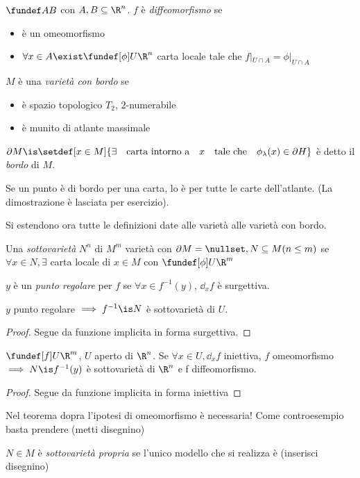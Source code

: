 \begin{defn}
$\fundef AB$ con $A,B\subseteq \R^n$. $f$ è \emph{diffeomorfismo} se
\begin{itemize}
 \item è un omeomorfismo
 \item $\forall x\in A \exist \fundef[\phi] U\R^n$ carta locale tale che $f|_{U\cap A}=\phi|_{U\cap A}$
\end{itemize}
\end{defn}
\begin{defn}
 $M$ è una \emph{varietà con bordo} se 
 \begin{itemize}
  \item è spazio topologico $T_2$, $2$-numerabile
  \item è munito di atlante massimale 
 \end{itemize}
\end{defn}
\begin{defn}[Bordo]
$\partial M\is \setdef[x\in M]{\exists\quad \text{carta intorno a}\quad x \quad\text{tale che}\quad \phi_{\lambda}(x) \in \partial H}$ è detto il \emph{bordo} di $M$.
\end{defn}
\begin{prop}
 Se un punto è di bordo per una carta, lo è per tutte le carte dell'atlante. (La dimostrazione è lasciata per esercizio).
\end{prop}
Si estendono ora tutte le definizioni date alle varietà alle varietà con bordo.
\begin{defn}[Sottovarietà]
 Una \emph{sottovarietà} $N^n$ di $M^m$ varietà con $\partial M = \nullset, N\subseteq M (n\le m)$ se $\forall x\in N, \exists$ carta locale di $x \in M$ con $\fundef[\phi] U\R^m $
\end{defn}
\begin{defn}
 $y$ è un \emph{punto regolare} per $f$ se $\forall x\in f^{-1}(y)$, $\dd_xf$ è surgettiva.
\end{defn}
\begin{prop}
 $y$ punto regolare $\implies f^{-1}\is N$ è sottovarietà di $U$.
\end{prop}
\begin{proof}
 Segue da funzione implicita in forma surgettiva.
\end{proof}
\begin{prop}
 $\fundef[f] U\R^m$, $U$ aperto di $\R^n$. Se $\forall x \in U, \dd_xf$ iniettiva, $f$ omeomorfismo$\implies N\is f^{-1}(y)$ è sottovarietà di $\R^n$ e f diffeomorfismo.
\end{prop}
\begin{proof}
 Segue da funzione implicita in forma iniettiva
\end{proof}
\begin{oss}
 Nel teorema dopra l'ipotesi di omeomorfismo è necessaria!
 Come controesempio basta prendere (metti disegnino)
\end{oss}

\begin{defn}
 $N\in M$ è \emph{sottovarietà propria} se l'unico modello che si realizza è (inserisci disegnino)
\end{defn}

